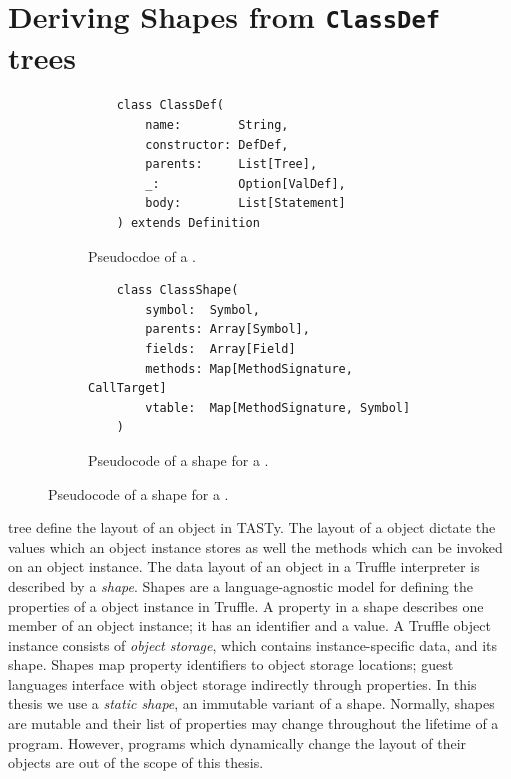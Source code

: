 \section{Deriving Shapes from \texttt{ClassDef} trees}

\begin{figure}[!htb]
	\centering
	\begin{subfigure}[b]{0.48\textwidth}
	\begin{verbatim}
	class ClassDef(
		name:        String,
		constructor: DefDef, 
		parents:     List[Tree], 
		_:           Option[ValDef], 
		body:        List[Statement]
	) extends Definition
		\end{verbatim}
	\caption{Pseudocdoe of a .}
	\label{recall:classdef}
	\end{subfigure}
	\hfill
	\begin{subfigure}[b]{0.48\textwidth}
	\begin{verbatim}
	class ClassShape(
		symbol:  Symbol,
		parents: Array[Symbol],
		fields:  Array[Field]
		methods: Map[MethodSignature, CallTarget]
		vtable:  Map[MethodSignature, Symbol]
	)
	\end{verbatim}
	\caption{Pseudocode of a shape for a .}
	\label{impl:classshape}
	\end{subfigure}
\end{figure}

 tree define the layout of an object in TASTy.
The layout of a object dictate the values which an object instance stores as well the methods which can be invoked on an object instance.
The data layout of an object in a Truffle interpreter is described by a \textit{shape}\cite{self:prototypes}\cite{truffle:object-model}.
Shapes are a language-agnostic model for defining the properties of a object instance in Truffle.
A property in a shape describes one member of an object instance; it has an identifier and a value.
A Truffle object instance consists of \textit{object storage}, which contains instance-specific data, and its shape.
Shapes map property identifiers to object storage locations; guest languages interface with object storage indirectly through properties.
In this thesis we use a \textit{static shape}, an immutable variant of a shape.
Normally, shapes are mutable and their list of properties may change throughout the lifetime of a program\cite{truffleruby:object-model}.
However, programs which dynamically change the layout of their objects\cite{java:reflection} are out of the scope of this thesis.

